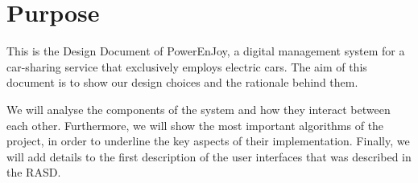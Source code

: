 \section{Purpose}
This is the Design Document of PowerEnJoy, a digital management system for a car-sharing service that exclusively employs electric cars.
The aim of this document is to show our design choices and the rationale behind them. 

We will analyse the components of the system and how they interact between each other.
Furthermore, we will show the most important algorithms of the project, in order to underline the key aspects of their implementation.
Finally, we will add details to the first description of the user interfaces that was described in the RASD.

